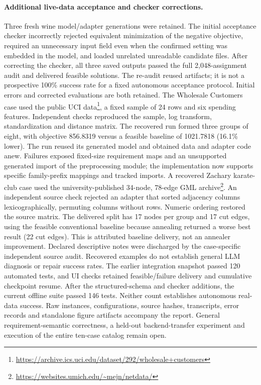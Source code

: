 \paragraph{Additional live-data acceptance and checker corrections.}
Three fresh wine model/adapter generations were retained. The initial acceptance checker incorrectly
rejected equivalent minimization of the negative objective, required an unnecessary input field
even when the confirmed setting was embedded in the model, and loaded unrelated unreadable candidate
files. After correcting the checker, all three saved outputs passed the full 2,048-assignment audit
and delivered feasible solutions. The re-audit reused artifacts; it is not a prospective 100\% success
rate for a fixed autonomous acceptance protocol. Initial errors and corrected evaluations are both retained.
The Wholesale Customers case used the public UCI data\footnote{\url{https://archive.ics.uci.edu/dataset/292/wholesale+customers}}, a fixed sample of 24 rows and six spending
features. Independent checks reproduced the sample, log transform, standardization and distance matrix.
The recovered run formed three groups of eight, with objective 856.8319 versus a feasible baseline
of 1021.7818 (16.1\% lower). The run reused its generated model and obtained data and adapter code anew.
Failures exposed fixed-size requirement maps and an unsupported generated import of the preprocessing
module; the implementation now supports specific family-prefix mappings and tracked imports.
A recovered Zachary karate-club case used the university-published 34-node, 78-edge GML archive\footnote{\url{https://websites.umich.edu/~mejn/netdata/}}.
An independent source check rejected an adapter that sorted adjacency columns lexicographically,
permuting columns without rows. Numeric ordering restored the source matrix. The delivered split
has 17 nodes per group and 17 cut edges, using the feasible conventional baseline because annealing
returned a worse best result (22 cut edges). This is attributed baseline delivery, not an annealer
improvement. Declared descriptive notes were discharged by the case-specific independent source audit.
Recovered examples do not establish general LLM diagnosis or repair success rates.
The earlier integration snapshot passed 120 automated tests, and UI checks retained feasible/failure delivery
and cumulative checkpoint resume. After the structured-schema and checker additions, the current offline
suite passed 146 tests. Neither count establishes autonomous real-data success. Raw instances, configurations, source hashes, transcripts, error records
and standalone figure artifacts accompany the report. General requirement-semantic correctness,
a held-out backend-transfer experiment and execution of the entire ten-case catalog remain open.
